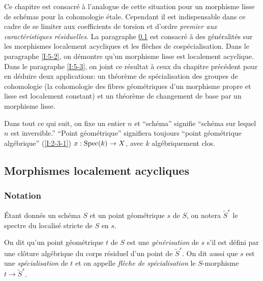 \documentclass[oneside]{book}
\begin{document}
Ce chapitre est consacré à l'analogue de cette situation pour un morphisme 
lisse de schémas pour la cohomologie étale. Cependant il est indispensable 
dans ce cadre de se limiter aux coefficients de torsion et d'ordre \emph{premier aux caractéristiques résiduelles}. La paragraphe \ref{I:5-1} est consacré 
à des généralités sur les morphismes localement acycliques et les 
flèches de cospécialisation. Dans le paragraphe \ref{I:5-2}, on démontre 
qu'un morphisme lisse est localement acyclique. Dans le paragraphe \ref{I:5-3}, on 
joint ce résultat à ceux du chapitre précédent pour en déduire deux 
applications: un théorème de spécialisation des groupes de cohomologie (la 
cohomologie des fibres géométriques d'un morphisme propre et lisse est 
localement constant) et un théorème de changement de base par un morphisme 
lisse. 

Dans tout ce qui suit, on fixe un entier $n$ et ``schéma'' signifie ``schéma 
sur lequel $n$ est inversible.'' ``Point géométrique'' signifiera toujours 
``point géométrique algébrique'' (\ref{I:2-3-1}) $x:\operatorname{Spec}(k)\to X$, avec $k$ 
algébriquement clos. 










\subsection{Morphismes localement acycliques}\label{I:5-1}





\subsubsection{Notation}\label{I:5-1-1}

Étant donnés un schéma $S$ et un point géométrique $s$ de $S$, on 
notera $\widetilde S^s$ le spectre du localisé stricte de $S$ en $s$. 





\begin{definition}\label{I:5-1-2}
On dit qu'un point géométrique $t$ de $S$ est une \emph{générisation} de 
$s$ s'il est défini par une clôture algébrique du corps résiduel d'un 
point de $\widetilde S^s$. On dit aussi que $s$ est une \emph{spécialisation} 
de $t$ et on appelle \emph{flèche de spécialisation} le $S$-morphisme 
$t\to \widetilde S^s$. 
\end{definition}
\end{document}
